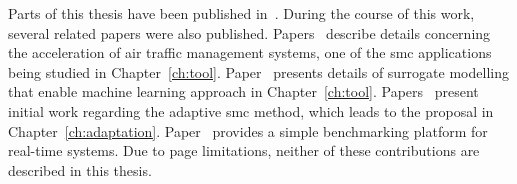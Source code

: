 Parts of this thesis have been published in~\cite{chau13fpt,chau13arc,chau14trets,chau14fccm}.
During the course of this work, several related papers were also published.
Papers~\cite{chau13acm,eele13cdc,eele13gnc} describe details concerning the acceleration of air traffic management systems, one of the \gls{smc} applications being studied in Chapter~\ref{ch:tool}.
Paper~\cite{kurek14fccm} presents details of surrogate modelling that enable machine learning approach in Chapter~\ref{ch:tool}.
Papers~\cite{chau12fpl,niu13fccm} present initial work regarding the adaptive \gls{smc} method, which leads to the proposal in Chapter~\ref{ch:adaptation}.
Paper~\cite{chau12heart} provides a simple benchmarking platform for real-time systems.
Due to page limitations, neither of these contributions are described in this thesis.



